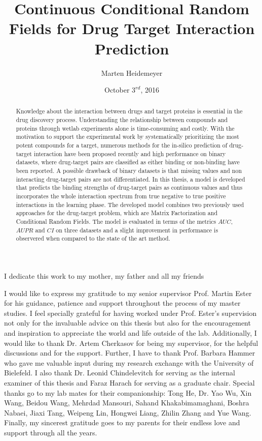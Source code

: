 \documentclass{sfuthesis}
\title{Continuous Conditional Random Fields for Drug Target Interaction Prediction}
\author{Marten Heidemeyer}
\date{October $3^{rd}$, 2016}
\begin{document}
\doublespacing
\large{
\frontmatter
\maketitle{}
\makecommittee{}
\doublespacing
\begin{abstract}
Knowledge about the interaction between drugs and target proteins is essential in the drug discovery process.
Understanding the relationship between compounds and proteins through wetlab experiments alone is time-consuming and costly. With the motivation to support the experimental work by systematically prioritizing the most potent compounds for a target, numerous methods for the in-silico prediction of drug-target interaction have been proposed recently and high performance on binary datasets, where drug-target pairs are classified as either binding or non-binding have been reported. A possible drawback of binary datasets is that missing values and non interacting drug-target pairs are not differentiated. In this thesis, a model is developed that predicts the binding strengths of drug-target pairs as continuous values and thus incorporates the whole interaction spectrum from true negative to true positive interactions in the learning phase. The developed model combines two previously used approaches for the drug-target problem, which are Matrix Factorization and Conditional Random Fields. The model is evaluated in terms of the metrics $AUC$, $AUPR$ and $CI$ on three datasets and a slight improvement in performance is observered when compared to the state of the art method.
\end{abstract}

\begin{dedication} %
I dedicate this work to my mother, my father and all my friends
\end{dedication}

\begin{acknowledgements} %
I would like to express my gratitude to my senior supervisor Prof. Martin Ester for his guidance, patience and support throughout the process of my master studies. I feel specially grateful for having worked under Prof. Ester's supervision not only for the invaluable advice on this thesis but also for the encouragement and inspiration to appreciate the world and life outside of the lab. Additionally, I would like to thank Dr. Artem Cherkasov for being my supervisor, for the helpful discussions and for the support. Further, I have to thank Prof. Barbara Hammer who gave me valuable input during my research exchange with the University of Bielefeld. I also thank Dr. Leonid Chindelevitch for serving as the internal examiner of this thesis and Faraz Harach for serving as a graduate chair. Special thanks go to my lab mates for their companionship: Tong He, Dr. Yao Wu, Xin Wang, Beidou Wang, Mehrdad Mansouri, Sahand Khakabimamaghani, Boshra Nabaei, Jiaxi Tang, Weipeng Lin, Hongwei Liang, Zhilin Zhang and Yue Wang.
Finally, my sincerest gratitude goes to my parents for their endless love and support through all the years.
\end{acknowledgements}

}
\end{document}
